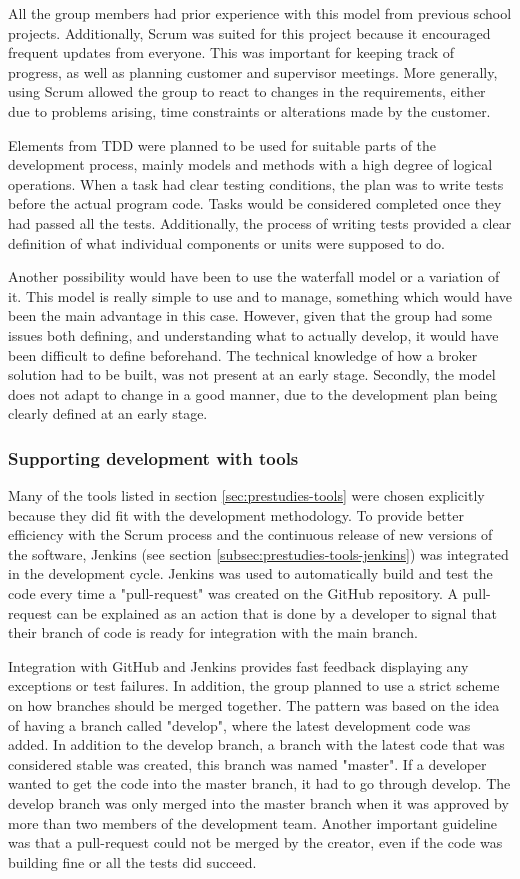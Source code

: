 All the group members had prior experience with this model from previous school projects. Additionally, Scrum was suited for this project because it encouraged frequent updates from everyone. This was important for keeping track of progress, as well as planning customer and supervisor meetings. More generally, using Scrum allowed the group to react to changes in the requirements, either due to problems arising, time constraints or alterations made by the customer. 

Elements from TDD were planned to be used for suitable parts of the development process, mainly models and methods with a high degree of logical operations. When a task had clear testing conditions, the plan was to write tests before the actual program code. Tasks would be considered completed once they had passed all the tests. Additionally, the process of writing tests provided a clear definition of what individual components or units were supposed to do.

Another possibility would have been to use the waterfall model or a variation of it. This model is really simple to use and to manage, something which would have been the main advantage in this case. However, given that the group had some issues both defining, and understanding what to actually develop, it would have been difficult to define beforehand. The technical knowledge of how a broker solution had to be built, was not present at an early stage. Secondly, the model does not adapt to change in a good manner, due to the development plan being clearly defined at an early stage. 

\subsubsection{Supporting development with tools}
Many of the tools listed in section \ref{sec:prestudies-tools} were chosen explicitly because they did fit with the development methodology. To provide better efficiency with the Scrum process and the continuous release of new versions of the software, Jenkins (see section \ref{subsec:prestudies-tools-jenkins}) was integrated in the development cycle. Jenkins was used to automatically build and test the code every time a "pull-request" was created on the GitHub repository. A pull-request can be explained as an action that is done by a developer to signal that their branch of code is ready for integration with the main branch. 

Integration with GitHub and Jenkins provides fast feedback displaying any exceptions or test failures. In addition, the group planned to use a strict scheme on how branches should be merged together. The pattern was based on the idea of having a branch called "develop", where the latest development code was added. In addition to the develop branch, a branch with the latest code that was considered stable was created, this branch was named "master". If a developer wanted to get the code into the master branch, it had to go through develop. The develop branch was only merged into the master branch when it was approved by more than two members of the development team. Another important guideline was that a pull-request could not be merged by the creator, even if the code was building fine or all the tests did succeed. 

